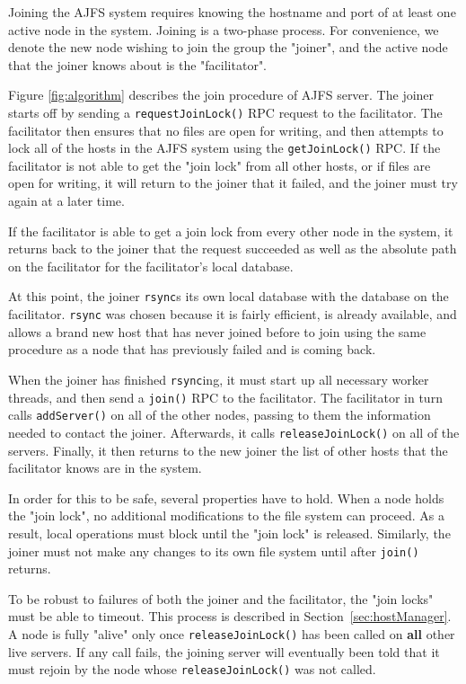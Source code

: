 
Joining the AJFS system requires knowing the hostname and port of at least one
active node in the system. Joining is a two-phase process. For convenience, we
denote the new node wishing to join the group the "joiner", and the active node
that the joiner knows about is the "facilitator".

Figure \ref{fig:algorithm} describes the join procedure of AJFS server. The joiner starts off by sending a \texttt{requestJoinLock()} RPC request to the
facilitator. The facilitator then ensures that no files are open for writing,
and then attempts to lock all of the hosts in the AJFS system using the
\texttt{getJoinLock()} RPC. If the facilitator is not able to get the "join
lock" from all other hosts, or if files are open for writing, it will return to
the joiner that it failed, and the joiner must try again at a later time.

If the facilitator is able to get a join lock from every other node in the
system, it returns back to the joiner that the request succeeded as well as the
absolute path on the facilitator for the facilitator's local database.

At this point, the joiner \texttt{rsync}s its own local database with the
database on the facilitator. \texttt{rsync} was chosen because it is fairly
efficient, is already available, and allows a brand new host that has never
joined before to join using the same procedure as a node that has previously
failed and is coming back.

When the joiner has finished \texttt{rsync}ing, it must start up all necessary
worker threads, and then send a \texttt{join()} RPC to the facilitator. The
facilitator in turn calls \texttt{addServer()} on all of the other nodes,
passing to them the information needed to contact the joiner. Afterwards, it
calls \texttt{releaseJoinLock()} on all of the servers. Finally, it then returns
to the new joiner the list of other hosts that the facilitator knows are in the
system.

In order for this to be safe, several properties have to hold. When a node 
holds the "join lock", no additional modifications to the file system can
proceed. As a result, local operations must block until the "join lock" is
released. Similarly, the joiner must not make any changes to its own file system
until after \texttt{join()} returns.

To be robust to failures of both the joiner and the facilitator, the "join
locks" must be able to timeout. This process is described in
Section~\ref{sec:hostManager}. A node is fully "alive" only once
\texttt{releaseJoinLock()} has been called on \textbf{all} other live servers.
If any call fails, the joining server will eventually been told that it must
rejoin by the node whose \texttt{releaseJoinLock()} was not called.

